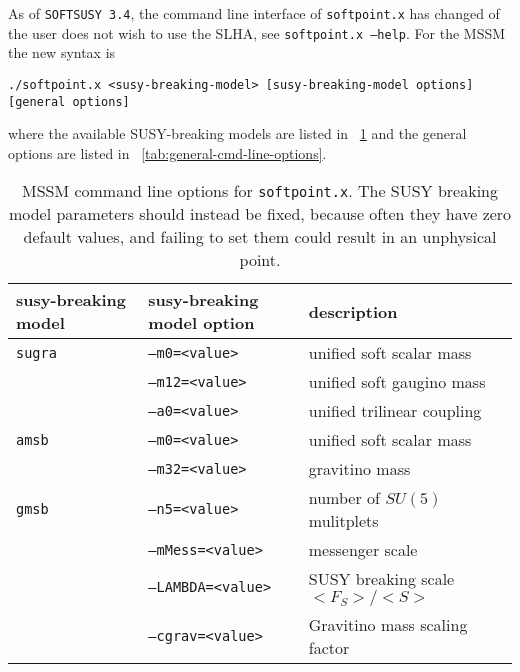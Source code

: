 \documentclass[]{article}
\def\code#1{\small{\tt #1}\normalsize}
\begin{document}
As of {\tt SOFTSUSY 3.4}, the command line interface of \code{softpoint.x} has 
changed of the user does not wish to use the SLHA, see \code{softpoint.x --help}.  
For the MSSM the new syntax is
\small
\begin{verbatim}
./softpoint.x <susy-breaking-model> [susy-breaking-model options] [general options]
\end{verbatim}
\normalsize
where the available SUSY-breaking models are listed in
\tablename~\ref{tab:mssm-cmd-line-options} and the general options are
listed in \tablename~\ref{tab:general-cmd-line-options}.
\begin{table}[tbh]
  \centering
  \begin{tabular}{lll}
    susy-breaking model & susy-breaking model option & description \\
    \hline
    \code{sugra} & \code{--m0=<value>} & unified soft scalar mass \\
                 & \code{--m12=<value>} & unified soft gaugino mass \\
                 & \code{--a0=<value>} & unified trilinear coupling \\
    \hline
    \code{amsb} & \code{--m0=<value>} & unified soft scalar mass \\
                & \code{--m32=<value>} & gravitino mass \\
    \hline
    \code{gmsb} & \code{--n5=<value>} & number of $SU(5)$ mulitplets \\
                & \code{--mMess=<value>} & messenger scale \\
                & \code{--LAMBDA=<value>} & SUSY breaking scale $<F_S> / <S>$ \\
                & \code{--cgrav=<value>} & Gravitino mass scaling factor \\
    \hline
  \end{tabular}
  \caption{MSSM command line options for \code{softpoint.x}.
The SUSY breaking model parameters should instead be fixed, because often they
have zero default values, and failing to set them could result in an
unphysical point.}
  \label{tab:mssm-cmd-line-options}
\end{table}
%
\end{document}
